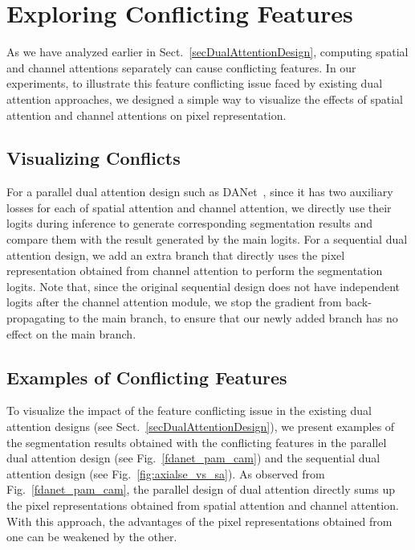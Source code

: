 \documentclass[letterpaper]{article} \usepackage{aaai22}  \usepackage{times}  \usepackage{helvet}  \usepackage{courier}  \usepackage[hyphens]{url}  \usepackage{graphicx} \urlstyle{rm} \def\UrlFont{\rm}  \usepackage{natbib}  \usepackage{caption} \DeclareCaptionStyle{ruled}{labelfont=normalfont,labelsep=colon,strut=off} \frenchspacing  \setlength{\pdfpagewidth}{8.5in}  \setlength{\pdfpageheight}{11in}  \usepackage{algorithm}
\begin{document}
\section{Exploring Conflicting Features}

As we have analyzed earlier in Sect.~\ref{secDualAttentionDesign}, computing spatial and channel attentions separately can cause conflicting features. 
In our experiments, to illustrate this feature conflicting issue faced by existing dual attention approaches, we designed a simple way to visualize the effects of spatial attention and channel attentions on pixel representation.

\subsection{Visualizing Conflicts}
For a parallel dual attention design such as DANet~\cite{cDualAttention}, since it has two auxiliary losses for each of spatial attention and channel attention, we directly use their logits during inference to generate corresponding segmentation results and compare them with the result generated by the main logits.
For a sequential dual attention design, we add an extra branch that directly uses the pixel representation obtained from channel attention to perform the segmentation logits. 
Note that, since the original sequential design does not have independent logits after the channel attention module, we stop the gradient from back-propagating to the main branch, to ensure that our newly added branch has no effect on the main branch.




\subsection{Examples of Conflicting Features}

To visualize the impact of the feature conflicting issue in the existing dual attention designs (see Sect.~\ref{secDualAttentionDesign}), we present examples of the segmentation results obtained with the conflicting features in the parallel dual attention design (see Fig.~\ref{fdanet_pam_cam}) and the sequential dual attention design (see Fig.~\ref{fig:axialse_vs_sa}). 
As observed from Fig.~\ref{fdanet_pam_cam}, the parallel design of dual attention directly sums up the pixel representations obtained from spatial attention and channel attention. 
With this approach, the advantages of the pixel representations obtained from one can be weakened by the other. 
\end{document}
